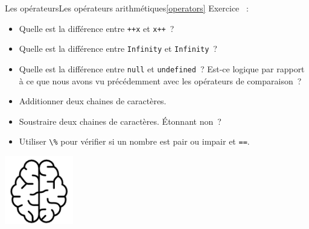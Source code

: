 \documentclass{beamer}
\begin{document}
    \begin{frame}{Les opérateurs}{Les opérateurs arithmétiques\cref{operators}}
        Exercice \execcounterdispinc{}~:
        \begin{itemize}
            \item Quelle est la différence entre \lstinline{++x} et \lstinline{x++}~?
            \item Quelle est la différence entre \lstinline{Infinity} et \lstinline{Infinity}~?
            \item Quelle est la différence entre \lstinline{null} et \lstinline{undefined}~?
            Est-ce logique par rapport à ce que nous avons vu précédemment avec les
            opérateurs de comparaison~?
            \item Additionner deux chaines de caractères.
            \item Soustraire deux chaines de caractères.
            Étonnant non~?
            \item Utiliser
            \lstinline{\%} pour vérifier si un nombre est pair ou impair et \lstinline{==}.
        \end{itemize}
        \bigbreak
        \centering
        \includegraphics[width=3cm]{image/intelligence}
    \end{frame}
\end{document}
